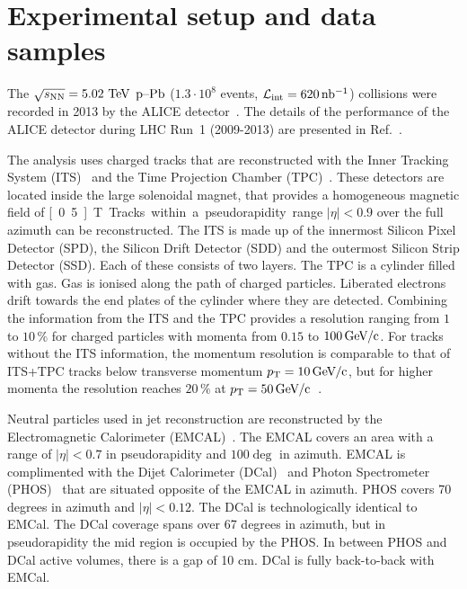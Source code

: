 
\section{Experimental setup and data samples}
\label{sec:experimentaldetails}
The $\sqrt{s_{\mathrm{NN}}} = 5.02~\mathrm{TeV}$ $\mbox{p--Pb}$ ($1.3 \cdot 10^{8}$ events, $\mathcal{L}_{\mathrm{int}} = \unit[620]{nb^{-1}}$) collisions were recorded in 2013 by the ALICE detector~\cite{aliceDetector}. The details of the performance of the ALICE detector during LHC Run~1 (2009-2013) are presented in Ref.~\cite{alicePerformance}.

The analysis uses charged tracks that are reconstructed with the Inner Tracking System (ITS)~\cite{aliceITS} and the Time Projection Chamber (TPC)~\cite{aliceTPC}. These detectors are located inside the large solenoidal magnet, that provides a homogeneous magnetic field of \unit[0.5]{T}. Tracks within a pseudorapidity range $|\eta| < 0.9$ over the full azimuth can be reconstructed. The ITS is made up of the innermost Silicon Pixel Detector (SPD), the Silicon Drift Detector (SDD) and the outermost Silicon Strip Detector (SSD). Each of these consists of two layers. The TPC is a cylinder filled with gas. Gas is ionised along the path of charged particles. Liberated electrons drift towards the end plates of the cylinder where they are detected. Combining the information from the ITS and the TPC provides a resolution ranging from $1$ to $10\,\%$ for charged particles with momenta from $0.15$ to $\unit[100]{\GeVc}$. For tracks without the ITS information, the momentum resolution is comparable to that of ITS+TPC tracks below transverse momentum $\pt{} = \unit[10]{\GeVc}$, but for higher momenta the resolution reaches $20\,\%$ at $\pt{} = \unit[50]{\GeVc}$~\cite{alicePerformance,aliceBackgroundFluctuation}. 

Neutral particles used in jet reconstruction are reconstructed by the Electromagnetic Calorimeter (EMCAL)~\cite{Cortese:2008zza}. The EMCAL covers an area with a range of $|\eta| < 0.7$  in pseudorapidity and $ 100 \deg $ in azimuth. EMCAL is complimented with the Dijet Calorimeter (DCal)~\cite{DCAL} and Photon Spectrometer (PHOS)~\cite{PHOS} that are situated opposite of the EMCAL in azimuth. PHOS covers 70 degrees in azimuth and $\left| \eta \right| < 0.12$. The DCal is technologically identical to EMCal. The DCal coverage spans over 67 degrees in azimuth, but in pseudorapidity the mid region is occupied by the PHOS. In between PHOS and DCal active volumes, there is a gap of 10 cm. DCal is fully back-to-back with EMCal.


